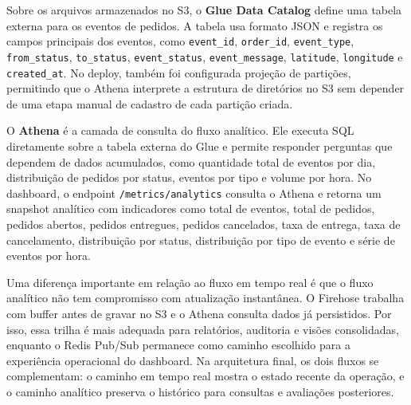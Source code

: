 ﻿\documentclass{article}
\begin{document}
Sobre os arquivos armazenados no S3, o \textbf{Glue Data Catalog} define uma tabela externa para os eventos de pedidos. A tabela usa formato JSON e registra os campos principais dos eventos, como \texttt{event\_id}, \texttt{order\_id}, \texttt{event\_type}, \texttt{from\_status}, \texttt{to\_status}, \texttt{event\_status}, \texttt{event\_message}, \texttt{latitude}, \texttt{longitude} e \texttt{created\_at}. No deploy, tamb\'em foi configurada proje\c{c}\~ao de parti\c{c}\~oes, permitindo que o Athena interprete a estrutura de diret\'orios no S3 sem depender de uma etapa manual de cadastro de cada parti\c{c}\~ao criada.

O \textbf{Athena} \'e a camada de consulta do fluxo anal\'itico. Ele executa SQL diretamente sobre a tabela externa do Glue e permite responder perguntas que dependem de dados acumulados, como quantidade total de eventos por dia, distribui\c{c}\~ao de pedidos por status, eventos por tipo e volume por hora. No dashboard, o endpoint \texttt{/metrics/analytics} consulta o Athena e retorna um snapshot anal\'itico com indicadores como total de eventos, total de pedidos, pedidos abertos, pedidos entregues, pedidos cancelados, taxa de entrega, taxa de cancelamento, distribui\c{c}\~ao por status, distribui\c{c}\~ao por tipo de evento e s\'erie de eventos por hora.

Uma diferen\c{c}a importante em rela\c{c}\~ao ao fluxo em tempo real \'e que o fluxo anal\'itico n\~ao tem compromisso com atualiza\c{c}\~ao instant\^anea. O Firehose trabalha com buffer antes de gravar no S3 e o Athena consulta dados j\'a persistidos. Por isso, essa trilha \'e mais adequada para relat\'orios, auditoria e vis\~oes consolidadas, enquanto o Redis Pub/Sub permanece como caminho escolhido para a experi\^encia operacional do dashboard. Na arquitetura final, os dois fluxos se complementam: o caminho em tempo real mostra o estado recente da opera\c{c}\~ao, e o caminho anal\'itico preserva o hist\'orico para consultas e avalia\c{c}\~oes posteriores.
\end{document}

